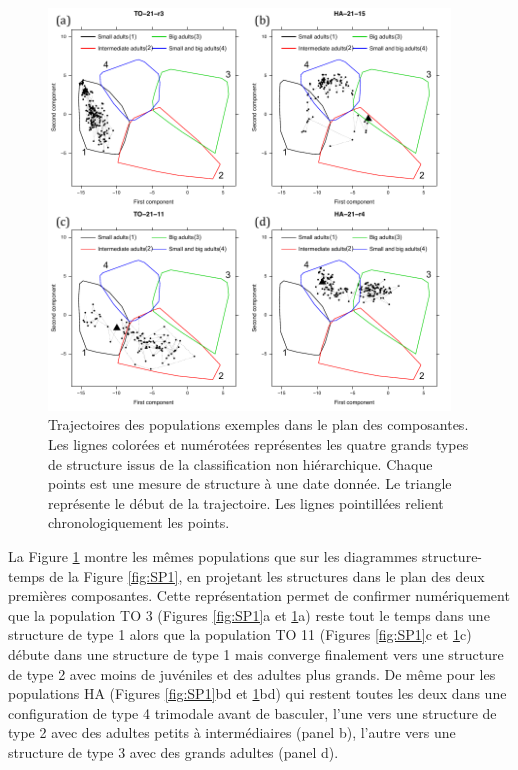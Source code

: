 \begin{figure}[!ht]
\begin{center}
\includegraphics[width=0.95\textwidth]{1_CorpsDeThese/Resumes/Fig/SP04}
\caption[Trajectoires des
popualtions exemple dans le plan des composantes]{Trajectoires des
populations exemples dans le plan des composantes. Les lignes colorées et
numérotées représentes les quatre grands types de structure issus de la
classification non hiérarchique. Chaque points est une mesure de structure à
une date donnée. Le triangle représente le début de la trajectoire. Les lignes
pointillées relient chronologiquement les points.}
\label{fig:SP4}
\end{center}
\end{figure}

La Figure \ref{fig:SP4} montre les mêmes populations que sur les diagrammes
structure-temps de la Figure \ref{fig:SP1}, en projetant les structures dans le
plan des deux premières composantes. Cette représentation permet de confirmer
numériquement que la population TO 3 (Figures \ref{fig:SP1}a et \ref{fig:SP4}a)
reste tout le temps dans une structure de type 1 alors que la population TO 11
(Figures \ref{fig:SP1}c et \ref{fig:SP4}c) débute dans une structure de type 1
mais converge finalement vers une structure de type 2 avec moins de juvéniles et
des adultes plus grands. De même pour les populations HA  (Figures
\ref{fig:SP1}bd et \ref{fig:SP4}bd) qui restent toutes les deux dans une
configuration de type 4 trimodale avant de basculer, l'une vers une structure de
type 2 avec des adultes petits à intermédiaires (panel b), l'autre vers une
structure de type 3 avec des grands adultes (panel d).

